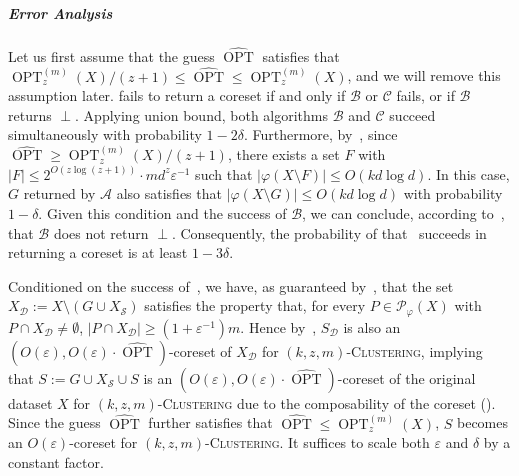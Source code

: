 \documentclass[letterpaper,11pt]{article}
\theoremstyle{plain}
\theoremstyle{definition}
\theoremstyle{remark}
\DeclareMathOperator{\OPT}{OPT}
\newcommand{\GOPT}{\widehat{\OPT}}
\newcommand{\eps}{\varepsilon}
\renewcommand{\phi}{\varphi}
\newcommand{\calA}{\mathcal{A}}
\newcommand{\calB}{\mathcal{B}}
\newcommand{\calC}{\mathcal{C}}
\newcommand{\calD}{\mathcal{D}}
\newcommand{\calP}{\mathcal{P}}
\newcommand{\calS}{\mathcal{S}}
\newcommand{\ProblemName}[1]{\textsc{#1}}
\newcommand{\kzmC}{\ProblemName{$(k,z,m)$-Clustering}\xspace}
\begin{document}
\subparagraph{Error Analysis} Let us first assume that the guess $\GOPT$ satisfies that $\OPT_z^{(m)}(X)/(z+1)\le \GOPT\le \OPT_z^{(m)}(X)$, and we will remove this assumption later.
 fails to return a coreset if and only if $\calB$ or $\calC$ fails, or if $\calB$ returns $\perp$. 
Applying union bound, both algorithms $\calB$ and $\calC$ succeed simultaneously with probability $1-2\delta$.
Furthermore, by~, since $\GOPT\ge \OPT_z^{(m)}(X)/(z+1)$, there exists a set $F$ with $|F|\le 2^{O(z\log(z+1))}\cdot md^z\eps^{-1}$ such that $|\phi(X\setminus F)|\le O(kd\log d)$. In this case, $G$ returned by $\calA$ also satisfies that $|\phi(X\setminus G)|\le O(kd\log d)$ with probability $1-\delta$. 
Given this condition and the success of $\calB$, we can conclude, according to~, that $\calB$ does not return $\perp$.
Consequently, the probability of that~ succeeds in returning a coreset is at least $1-3\delta$.

Conditioned on the success of~, we have, as guaranteed by~, that the set $X_{\calD}:=X\setminus (G\cup X_{\calS})$ satisfies the property that, for every $P\in \calP_\phi(X)$ with $P\cap X_{\calD}\neq\emptyset$, $|P\cap X_{\calD}|\ge (1+\eps^{-1})m$. 
Hence by~, $S_{\calD}$ is also an $\left(O(\eps),O(\eps)\cdot \GOPT\right)$-coreset of $X_{\calD}$ for \kzmC, implying that $S:=G\cup X_{\calS}\cup S$ is an $\left(O(\eps),O(\eps)\cdot \GOPT\right)$-coreset of the original dataset $X$ for \kzmC due to the composability of the coreset ().
Since the guess $\GOPT$ further satisfies that $\GOPT\le \OPT_z^{(m)}(X)$, $S$ becomes an $O(\eps)$-coreset for \kzmC. It suffices to scale both $\eps$ and $\delta$ by a constant factor.
\end{document}
